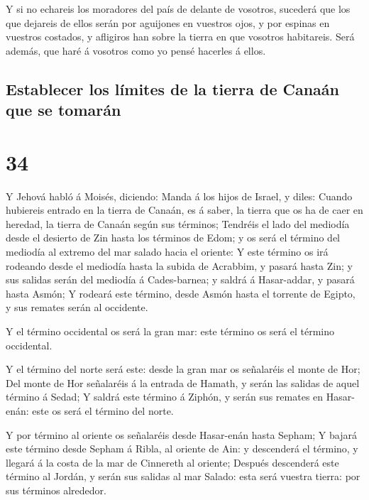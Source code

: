  Y si no echareis los moradores del país de delante de
vosotros, sucederá que los que dejareis de ellos serán por aguijones en
vuestros ojos, y por espinas en vuestros costados, y afligiros han sobre
la tierra en que vosotros habitareis.  Será además, que
haré á vosotros como yo pensé hacerles á ellos.

\hypertarget{establecer-los-luxedmites-de-la-tierra-de-canauxe1n-que-se-tomaruxe1n}{%
\subsection{Establecer los límites de la tierra de Canaán que se
tomarán}\label{establecer-los-luxedmites-de-la-tierra-de-canauxe1n-que-se-tomaruxe1n}}

\hypertarget{section-33}{%
\section{34}\label{section-33}}

 Y Jehová habló á Moisés, diciendo:  Manda á
los hijos de Israel, y diles: Cuando hubiereis entrado en la tierra de
Canaán, es á saber, la tierra que os ha de caer en heredad, la tierra de
Canaán según sus términos;  Tendréis el lado del mediodía
desde el desierto de Zin hasta los términos de Edom; y os será el
término del mediodía al extremo del mar salado hacia el oriente:
 Y este término os irá rodeando desde el mediodía hasta la
subida de Acrabbim, y pasará hasta Zin; y sus salidas serán del mediodía
á Cades-barnea; y saldrá á Hasar-addar, y pasará hasta Asmón;
 Y rodeará este término, desde Asmón hasta el torrente de
Egipto, y sus remates serán al occidente.

 Y el término occidental os será la gran mar: este término
os será el término occidental.

 Y el término del norte será este: desde la gran mar os
señalaréis el monte de Hor;  Del monte de Hor señalaréis á
la entrada de Hamath, y serán las salidas de aquel término á Sedad;
 Y saldrá este término á Ziphón, y serán sus remates en
Hasar-enán: este os será el término del norte.

 Y por término al oriente os señalaréis desde Hasar-enán
hasta Sepham;  Y bajará este término desde Sepham á
Ribla, al oriente de Ain: y descenderá el término, y llegará á la costa
de la mar de Cinnereth al oriente;  Después descenderá
este término al Jordán, y serán sus salidas al mar Salado: esta será
vuestra tierra: por sus términos alrededor.

